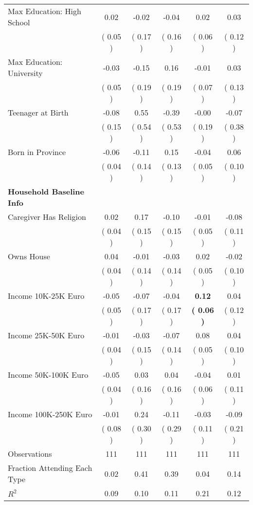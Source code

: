 \begin{table}[H]
{\begin{tabular}{lccccc}
\quad Max Education: High School &      0.02 &     -0.02 &     -0.04 &      0.02 &      0.03 \\
\quad  & (     0.05 ) & (     0.17 )  & (     0.16 )  & (     0.06 ) & (     0.12 ) \\
\quad Max Education: University &     -0.03 &     -0.15 &      0.16 &     -0.01 &      0.03 \\
\quad  & (     0.05 ) & (     0.19 )  & (     0.19 )  & (     0.07 ) & (     0.13 ) \\
\quad Teenager at Birth &     -0.08 &      0.55 &     -0.39 &     -0.00 &     -0.07 \\
\quad  & (     0.15 ) & (     0.54 )  & (     0.53 )  & (     0.19 ) & (     0.38 ) \\
\quad Born in Province &     -0.06 &     -0.11 &      0.15 &     -0.04 &      0.06 \\
\quad  & (     0.04 ) & (     0.14 )  & (     0.13 )  & (     0.05 ) & (     0.10 ) \\
\midrule
\textbf{Household Baseline Info} \\
\quad Caregiver Has Religion &      0.02 &      0.17 &     -0.10 &     -0.01 &     -0.08 \\
\quad  & (     0.04 ) & (     0.15 )  & (     0.15 )  & (     0.05 ) & (     0.11 ) \\
\quad Owns House &      0.04 &     -0.01 &     -0.03 &      0.02 &     -0.02 \\
\quad  & (     0.04 ) & (     0.14 )  & (     0.14 )  & (     0.05 ) & (     0.10 ) \\
\quad Income 10K-25K Euro &     -0.05 &     -0.07 &     -0.04 & \textbf{     0.12} &      0.04 \\
\quad  & (     0.05 ) & (     0.17 )  & (     0.17 )  & \textbf{(     0.06 )} & (     0.12 ) \\
\quad Income 25K-50K Euro &     -0.01 &     -0.03 &     -0.07 &      0.08 &      0.04 \\
\quad  & (     0.04 ) & (     0.15 )  & (     0.14 )  & (     0.05 ) & (     0.10 ) \\
\quad Income 50K-100K Euro &     -0.05 &      0.03 &      0.04 &     -0.04 &      0.01 \\
\quad  & (     0.04 ) & (     0.16 )  & (     0.16 )  & (     0.06 ) & (     0.11 ) \\
\quad Income 100K-250K Euro &     -0.01 &      0.24 &     -0.11 &     -0.03 &     -0.09 \\
\quad  & (     0.08 ) & (     0.30 )  & (     0.29 )  & (     0.11 ) & (     0.21 ) \\
\midrule
Observations & 111 & 111 & 111 & 111 & 111 \\
Fraction Attending Each Type &      0.02 &      0.41 &      0.39 &      0.04 &      0.14 \\
\midrule
$ R^2$ &      0.09 &      0.10 &      0.11 &      0.21 &      0.12 \\
\bottomrule
\end{tabular}}
\end{table}
